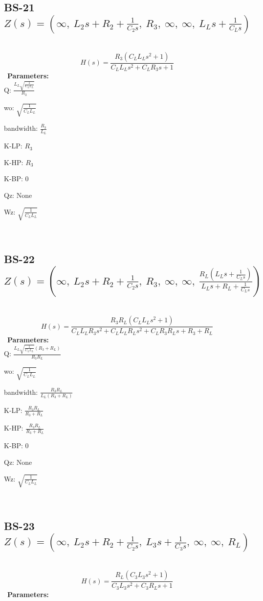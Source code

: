 \documentclass{article}
\begin{document}
\subsection{BS-21 $Z(s) = \left( \infty, \  L_{2} s + R_{2} + \frac{1}{C_{2} s}, \  R_{3}, \  \infty, \  \infty, \  L_{L} s + \frac{1}{C_{L} s}\right)$ } \ 
\textbf{\[H(s) = \frac{R_{3} \left(C_{L} L_{L} s^{2} + 1\right)}{C_{L} L_{L} s^{2} + C_{L} R_{3} s + 1}\] } \ 
\textbf{Parameters:}\\ 

Q: $\frac{L_{L} \sqrt{\frac{1}{C_{L} L_{L}}}}{R_{3}}$\ 

wo: $\sqrt{\frac{1}{C_{L} L_{L}}}$\ 

bandwidth: $\frac{R_{3}}{L_{L}}$\ 

K-LP: $R_{3}$\ 

K-HP: $R_{3}$\ 

K-BP: $0$\ 

Qz: $\text{None}$\ 

Wz: $\sqrt{\frac{1}{C_{L} L_{L}}}$\ 

\ 

\subsection{BS-22 $Z(s) = \left( \infty, \  L_{2} s + R_{2} + \frac{1}{C_{2} s}, \  R_{3}, \  \infty, \  \infty, \  \frac{R_{L} \left(L_{L} s + \frac{1}{C_{L} s}\right)}{L_{L} s + R_{L} + \frac{1}{C_{L} s}}\right)$ } \ 
\textbf{\[H(s) = \frac{R_{3} R_{L} \left(C_{L} L_{L} s^{2} + 1\right)}{C_{L} L_{L} R_{3} s^{2} + C_{L} L_{L} R_{L} s^{2} + C_{L} R_{3} R_{L} s + R_{3} + R_{L}}\] } \ 
\textbf{Parameters:}\\ 

Q: $\frac{L_{L} \sqrt{\frac{1}{C_{L} L_{L}}} \left(R_{3} + R_{L}\right)}{R_{3} R_{L}}$\ 

wo: $\sqrt{\frac{1}{C_{L} L_{L}}}$\ 

bandwidth: $\frac{R_{3} R_{L}}{L_{L} \left(R_{3} + R_{L}\right)}$\ 

K-LP: $\frac{R_{3} R_{L}}{R_{3} + R_{L}}$\ 

K-HP: $\frac{R_{3} R_{L}}{R_{3} + R_{L}}$\ 

K-BP: $0$\ 

Qz: $\text{None}$\ 

Wz: $\sqrt{\frac{1}{C_{L} L_{L}}}$\ 

\ 

\subsection{BS-23 $Z(s) = \left( \infty, \  L_{2} s + R_{2} + \frac{1}{C_{2} s}, \  L_{3} s + \frac{1}{C_{3} s}, \  \infty, \  \infty, \  R_{L}\right)$ } \ 
\textbf{\[H(s) = \frac{R_{L} \left(C_{3} L_{3} s^{2} + 1\right)}{C_{3} L_{3} s^{2} + C_{3} R_{L} s + 1}\] } \ 
\textbf{Parameters:}\\ 
\end{document}

